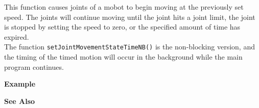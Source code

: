 This function causes joints of a mobot to begin moving at the previously set
speed. The joints will continue moving until the joint hits a joint limit, 
the joint is stopped by setting the speed to zero, or the specified amount of
time has expired. \\

The function \texttt{setJointMovementStateTimeNB()} is the non-blocking version, and
the timing of the timed motion will occur in the background while the main program continues.

\noindent
{\bf Example}\\
\noindent

\noindent
{\bf See Also}\\

